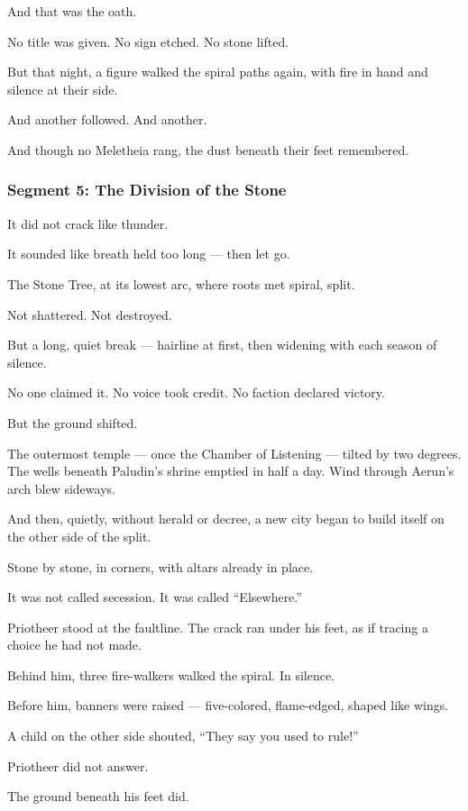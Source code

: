 \documentclass[9pt]{article}
\begin{document}
And that was the oath.

No title was given.  
No sign etched.  
No stone lifted.

But that night, a figure walked the spiral paths again,  
with fire in hand  
and silence at their side.

And another followed.  
And another.

And though no Meletheia rang,  
the dust beneath their feet remembered.

\newpage

\subsubsection*{Segment 5: The Division of the Stone}


It did not crack like thunder.

It sounded like breath held too long —  
then let go.

The Stone Tree, at its lowest arc,  
where roots met spiral,  
split.

Not shattered. Not destroyed.

But a long, quiet break —  
hairline at first,  
then widening with each season of silence.

No one claimed it.  
No voice took credit.  
No faction declared victory.

But the ground shifted.

The outermost temple — once the Chamber of Listening — tilted by two degrees.  
The wells beneath Paludin’s shrine emptied in half a day.  
Wind through Aerun’s arch blew sideways.

And then, quietly, without herald or decree,  
a new city began to build itself on the other side of the split.

Stone by stone,  
in corners,  
with altars already in place.

It was not called secession.  
It was called “Elsewhere.”

Priotheer stood at the faultline.  
The crack ran under his feet,  
as if tracing a choice he had not made.

Behind him, three fire-walkers walked the spiral.  
In silence.

Before him, banners were raised —  
five-colored, flame-edged, shaped like wings.

A child on the other side shouted,  
 “They say you used to rule!”

Priotheer did not answer.

The ground beneath his feet did.
\end{document}
